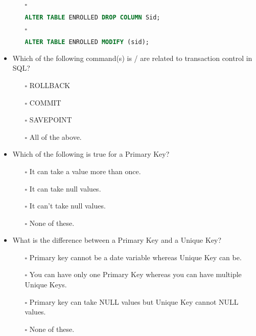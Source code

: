 \documentclass[10pt]{article}
\begin{document}
\begin{itemize}
\begin{enumerate}
					\item[$\square$]
						\begin{lstlisting}[language=SQL,firstline=1, lastline=1, numbers = right] 
							ALTER TABLE ENROLLED DROP COLUMN Sid;
						\end{lstlisting}
					
					\item[$\square$]
						\begin{lstlisting}[language=SQL,firstline=1, lastline=1, numbers = right] 
							ALTER TABLE ENROLLED MODIFY (sid);
						\end{lstlisting}
				\end{enumerate}

			\newpage	

			\item Which of the following command(s) is /  are related to transaction control in SQL?
				\begin{enumerate}
					\item[$\square$] ROLLBACK
					\item[$\square$] COMMIT
					\item[$\square$] SAVEPOINT
					\item[$\square$] All of the above.
				\end{enumerate}

			\item Which of the following is true for a Primary Key?
				\begin{enumerate}
					\item[$\square$] It can take a value more than once.
					\item[$\square$] It can take null values.
					\item[$\square$] It can’t take null values.
					\item[$\square$] None of these.
				\end{enumerate}

			\item What is the difference between a Primary Key and a Unique Key?
				\begin{enumerate}
					\item[$\square$] Primary key cannot be a date variable whereas Unique Key can be.
					\item[$\square$] You can have only one Primary Key whereas you can have multiple Unique Keys.
					\item[$\square$] Primary key can take NULL values but Unique Key cannot NULL values.
					\item[$\square$] None of these.
				\end{enumerate}


\end{itemize}
\end{document}
